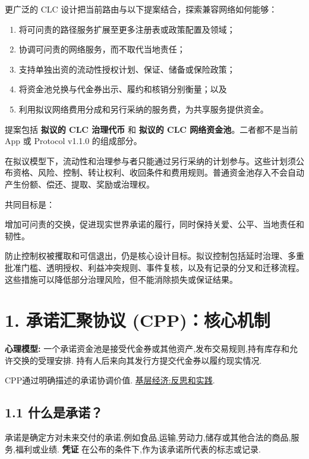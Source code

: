 \documentclass[11pt]{article}
\begin{document}
更广泛的 CLC 设计把当前路由与以下提案结合，探索兼容网络如何能够：

\begin{enumerate}[leftmargin=*]
\item 将可问责的路径服务扩展至更多注册表或政策配置及领域；
\item 协调可问责的网络服务，而不取代当地责任；
\item 支持单独出资的流动性授权计划、保证、储备或保险政策；
\item 将资金池兑换与代金券出示、履约和核销分别衡量；以及
\item 利用拟议网络费用分成和另行采纳的服务费，为共享服务提供资金。
\end{enumerate}
提案包括 \textbf{拟议的 CLC 治理代币} 和 \textbf{拟议的 CLC 网络资金池}。二者都不是当前 App 或 Protocol v1.1.0 的组成部分。

在拟议模型下，流动性和治理参与者只能通过另行采纳的计划参与。这些计划须公布资格、风险、控制、转让权利、收回条件和费用规则。普通资金池存入不会自动产生份额、偿还、提取、奖励或治理权。

共同目标是：

增加可问责的交换，促进现实世界承诺的履行，同时保持关爱、公平、当地责任和韧性。

防止控制权被攫取和可信退出，仍是核心设计目标。拟议控制包括延时治理、多重批准门槛、透明授权、利益冲突规则、事件复核，以及有记录的分叉和迁移流程。这些措施可以降低部分治理风险，但不能消除损失或保证结果。


\section*{1. 承诺汇聚协议 (CPP)：核心机制}

\textbf{心理模型:} 一个承诺资金池是接受代金券或其他资产,发布交易规则,持有库存和允许交换的受理安排. 持有人后来向其发行方提交代金券以履约现实情况.

CPP通过明确描述的承诺协调价值. \href{https://willruddick.substack.com/p/grassroots-economics-the-book-is}{基层经济:反思和实践}.

\subsection*{1.1 什么是承诺？}

承诺是确定方对未来交付的承诺,例如食品,运输,劳动力,储存或其他合法的商品,服务,福利或业绩. \textbf{凭证} 在公布的条件下,作为该承诺所代表的标志或记录.
\end{document}
